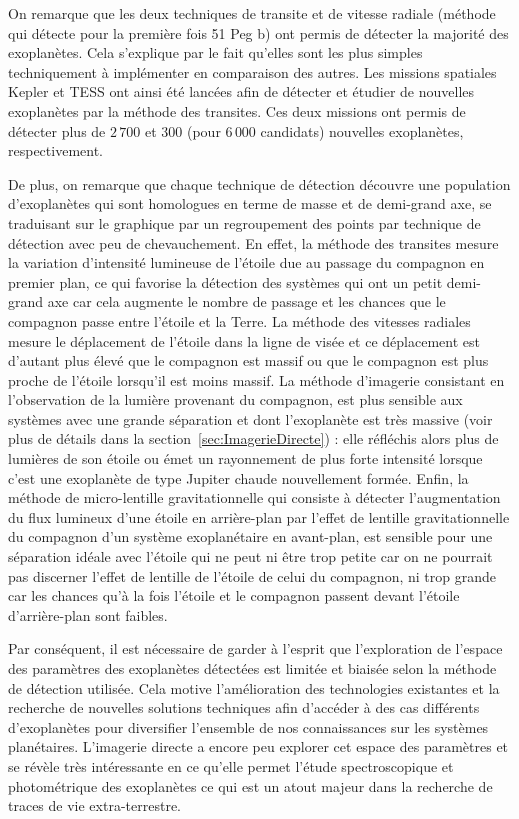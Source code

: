 On remarque que les deux techniques de transite et de vitesse radiale (méthode qui détecte pour la première fois 51 Peg b) ont permis de détecter la majorité des exoplanètes. Cela s'explique par le fait qu'elles sont les plus simples techniquement à implémenter en comparaison des autres. Les missions spatiales Kepler \citep{borucki2010} et \ac{TESS} \citep{ricker2016} ont ainsi été lancées afin de détecter et étudier de nouvelles exoplanètes par la méthode des transites. Ces deux missions ont permis de détecter plus de $2\,700$ et $300$ (pour $6\,000$ candidats) nouvelles exoplanètes, respectivement.

De plus, on remarque que chaque technique de détection découvre une population d'exoplanètes qui sont homologues en terme de masse et de demi-grand axe, se traduisant sur le graphique par un regroupement des points par technique de détection avec peu de chevauchement. En effet, la méthode des transites mesure la variation d'intensité lumineuse de l'étoile due au passage du compagnon en premier plan, ce qui favorise la détection des systèmes qui ont un petit demi-grand axe car cela augmente le nombre de passage et les chances que le compagnon passe entre l'étoile et la Terre. La méthode des vitesses radiales mesure le déplacement de l'étoile dans la ligne de visée et ce déplacement est d'autant plus élevé que le compagnon est massif ou que le compagnon est plus proche de l'étoile lorsqu'il est moins massif. La méthode d'imagerie consistant en l'observation de la lumière provenant du compagnon, est plus sensible aux systèmes avec une grande séparation et dont l'exoplanète est très massive (voir plus de détails dans la section~\ref{sec:ImagerieDirecte}) : elle réfléchis alors plus de lumières de son étoile ou émet un rayonnement de plus forte intensité lorsque c'est une exoplanète de type Jupiter chaude nouvellement formée. Enfin, la méthode de micro-lentille gravitationnelle qui consiste à détecter l'augmentation du flux lumineux d'une étoile en arrière-plan par l'effet de lentille gravitationnelle du compagnon d'un système exoplanétaire en avant-plan, est sensible pour une séparation idéale avec l'étoile qui ne peut ni être trop petite car on ne pourrait pas discerner l'effet de lentille de l'étoile de celui du compagnon, ni trop grande car les chances qu'à la fois l'étoile et le compagnon passent devant l'étoile d'arrière-plan sont faibles.

Par conséquent, il est nécessaire de garder à l'esprit que l'exploration de l'espace des paramètres des exoplanètes détectées est limitée et biaisée selon la méthode de détection utilisée. Cela motive l'amélioration des technologies existantes et la recherche de nouvelles solutions techniques afin d'accéder à des cas différents d'exoplanètes pour diversifier l'ensemble de nos connaissances sur les systèmes planétaires. L'imagerie directe a encore peu explorer cet espace des paramètres et se révèle très intéressante en ce qu'elle permet l'étude spectroscopique et photométrique des exoplanètes ce qui est un atout majeur dans la recherche de traces de vie extra-terrestre.


